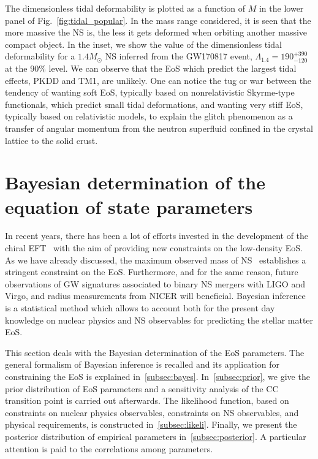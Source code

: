 The dimensionless tidal deformability is plotted as a function of $M$ in the 
lower panel of Fig.~\ref{fig:tidal_popular}. In the mass range considered, it 
is seen that the more massive the NS is, the less it gets deformed when 
orbiting another massive compact object. In the inset, we show the value of
the dimensionless tidal deformability for a $1.4M_\odot$ NS inferred from the 
GW170817 event, $\Lambda_{1.4} = 190_{-120}^{+390}$ at the $90\%$ level. We can
observe that the EoS which predict the largest tidal effects, PKDD and TM1, are 
unlikely. One can notice the tug or war between the tendency of wanting soft 
EoS, typically based on nonrelativistic Skyrme-type functionals, which predict 
small tidal deformations, and wanting very stiff EoS, typically based on 
relativistic models, to explain the glitch phenomenon as a transfer of angular
momentum from the neutron superfluid confined in the crystal lattice to the 
solid crust.

\section{Bayesian determination of the equation of state
parameters}\label{sec:bayes}

In recent years, there has been a lot of efforts invested in the development of
the chiral EFT~\cite{Drischler2016} with the aim of 
providing new constraints on the low-density EoS. As we have already discussed, 
the maximum observed mass of NS~\cite{Antoniadis2013,Cromartie2020} establishes 
a stringent constraint on the EoS. Furthermore, and for the same
reason, future observations of GW signatures associated to binary NS mergers 
with LIGO and Virgo, and radius measurements from NICER will beneficial.
Bayesian inference is a statistical method which allows to account both for the 
present day knowledge on nuclear physics and NS observables for predicting the 
stellar matter EoS.

This section deals with the Bayesian determination of the EoS
parameters. The general formalism of Bayesian inference is recalled and its
application for constraining the EoS is explained in~\ref{subsec:bayes}.
In~\ref{subsec:prior}, we give the prior distribution of EoS parameters
and a sensitivity analysis of the CC transition point is carried out 
afterwards. The likelihood function, based on constraints on nuclear physics
observables, constraints on NS observables, and physical requirements, is 
constructed in~\ref{subsec:likeli}. Finally, we present the posterior 
distribution of empirical parameters in~\ref{subsec:posterior}. A particular 
attention is paid to the correlations among parameters.

